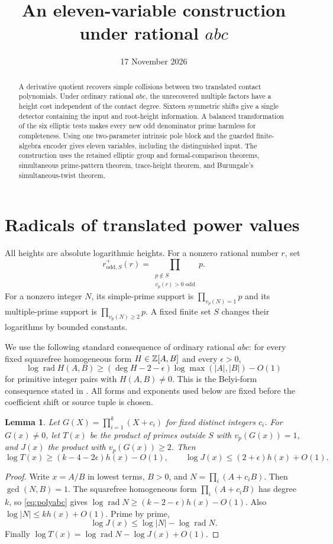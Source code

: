 \documentclass[11pt,a4paper]{article}
\title{An eleven-variable construction under rational \texorpdfstring{$abc$}{abc}}
\author{}\date{17 November 2026}
\newtheorem{lemma}[theorem]{Lemma}
\DeclareMathOperator{\rad}{rad}\DeclareMathOperator{\Tr}{Tr}
\begin{document}
\maketitle

\begin{abstract}
A derivative quotient recovers simple collisions between two translated
contact polynomials. Under ordinary rational $abc$, the unrecovered
multiple factors have a height cost independent of the contact degree.
Sixteen symmetric shifts give a single detector containing the input and
root-height information. A balanced transformation of the six elliptic
tests makes every new odd denominator prime harmless for completeness.
Using one two-parameter intrinsic pole block and the guarded finite-algebra
encoder gives eleven variables, including the distinguished input.
The construction uses the retained elliptic group and formal-comparison
theorems, simultaneous prime-pattern theorem, trace-height theorem, and
Burungale's simultaneous-twist theorem.
\end{abstract}

\section{Radicals of translated power values}

All heights are absolute logarithmic heights. For a nonzero rational
number $r$, set
\[
 r^+_{\mathrm{odd},S}(r)=
 \prod_{\substack{p\notin S\\v_p(r)>0\text{ odd}}}p.
\]
For a nonzero integer $N$, its simple-prime support is
$\prod_{v_p(N)=1}p$ and its multiple-prime support is
$\prod_{v_p(N)\ge2}p$. A fixed finite set $S$ changes their logarithms
by bounded constants.

We use the following standard consequence of ordinary rational $abc$:
for every fixed squarefree homogeneous form $H\in\mathbb Z[A,B]$ and every
$\epsilon>0$,
\begin{equation}\label{eq:polyabc}
 \log\rad H(A,B)\ge(\deg H-2-\epsilon)\log\max(|A|,|B|)-O(1)
\end{equation}
for primitive integer pairs with $H(A,B)\ne0$.
This is the Belyi-form consequence stated in
\cite[Appendix A.2, equation (A.2)]{RSZ}.
All forms and exponents used below are fixed before the coefficient
shift or source tuple is chosen.

\begin{lemma}\label{lem:simple}
Let $G(X)=\prod_{i=1}^k(X+c_i)$ for fixed distinct integers $c_i$.
For $G(x)\ne0$, let $T(x)$ be the product of primes outside $S$
with $v_p(G(x))=1$, and $J(x)$ the product with
$v_p(G(x))\ge2$. Then
\[
 \log T(x)\ge(k-4-2\epsilon)h(x)-O(1),\qquad
 \log J(x)\le(2+\epsilon)h(x)+O(1).
\]
\end{lemma}
\begin{proof}
Write $x=A/B$ in lowest terms, $B>0$, and
$N=\prod_i(A+c_iB)$. Then $\gcd(N,B)=1$.
The squarefree homogeneous form $\prod_i(A+c_iB)$ has degree $k$,
so \eqref{eq:polyabc} gives
$\log\rad N\ge(k-2-\epsilon)h(x)-O(1)$.
Also $\log|N|\le k h(x)+O(1)$. Prime by prime,
\[
 \log J(x)\le\log|N|-\log\rad N.
\]
Finally $\log T(x)=\log\rad N-\log J(x)+O(1)$.
\end{proof}
\end{document}
